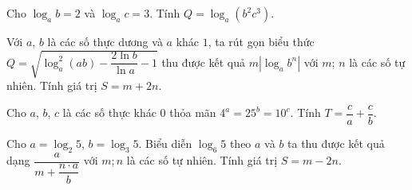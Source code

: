 
\begin{ex}%
	Cho  $\log_a b=2$ và $\log_a c=3$. Tính $Q=\log_a (b^2c^3)$.
\end{ex}

\begin{ex}%
	Với $a$, $b$ là các số  thực dương và $a$ khác $1$, ta rút gọn biểu thức $Q=\sqrt{\log_a^2(ab)-\dfrac{2\ln b}{\ln a}-1}$ thu được kết quả $m\left|\log_a b^n \right|$ với $m$; $n$ là các số tự nhiên. Tính giá trị $S=m+2n$.
\end{ex}

\begin{ex}%
	Cho $a$, $b$, $c$ là các số thực khác $0$ thỏa mãn $4^a=25^b=10^c$.  Tính $T=\dfrac{c}{a}+\dfrac{c}{b}$.
\end{ex}

\begin{ex}%
	Cho $a=\log_2 5$, $b=\log_3 5$. Biểu diễn $\log_6 5$ theo $a$ và $b$  ta thu được kết quả dạng $\dfrac{a}{m+\dfrac{n\cdot a}{b}}$ với $m;n$ là các số tự nhiên. Tính giá trị $S=m-2n$.
\end{ex}

